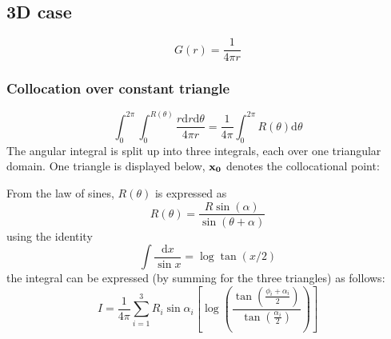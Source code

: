 \documentclass[a4paper,11pt]{article}
\newcommand{\td}{\mathrm{d}}
\begin{document}
\subsection{3D case}

\begin{equation}
G(r) = \frac{1}{4\pi r}
\end{equation}

\subsubsection{Collocation over constant triangle}

\begin{equation}
\int_0^{2\pi} \int_0^{R(\theta)} \frac{r \td r \td \theta}{4\pi r}
=
\frac{1}{4\pi}\int_0^{2\pi} R(\theta) \td \theta
\end{equation}
%
The angular integral is split up into three integrals, each over one triangular domain.
One triangle is displayed below, $\bf x_0$ denotes the collocational point:


From the law of sines, $R(\theta)$ is expressed as
%
\begin{equation}
R(\theta) = \frac{R \sin(\alpha)}{\sin(\theta+\alpha)}
\end{equation}
%
using the identity
%
\begin{equation}
\int \frac{\td x}{\sin x} = \log \tan (x/2)
\end{equation}
%
the integral can be expressed (by summing for the three triangles) as follows:
%
\begin{equation}
I = \frac{1}{4\pi} \sum_{i = 1}^3
R_i \sin\alpha_i \left[ \log \left( \frac{\tan\left(\frac{\phi_i+\alpha_i}{2}\right)}{\tan\left(\frac{\alpha_i}{2}\right)}\right)\right]
\end{equation}
\end{document}
